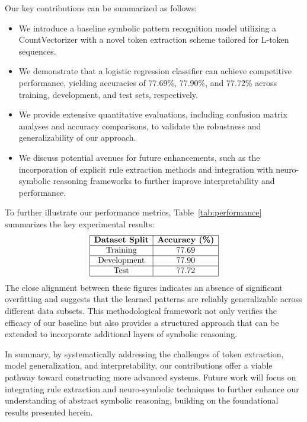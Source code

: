 \documentclass{article}
\begin{document}
Our key contributions can be summarized as follows:
\begin{itemize}
    \item We introduce a baseline symbolic pattern recognition model utilizing a CountVectorizer with a novel token extraction scheme tailored for L-token sequences.
    \item We demonstrate that a logistic regression classifier can achieve competitive performance, yielding accuracies of 77.69\%, 77.90\%, and 77.72\% across training, development, and test sets, respectively.
    \item We provide extensive quantitative evaluations, including confusion matrix analyses and accuracy comparisons, to validate the robustness and generalizability of our approach.
    \item We discuss potential avenues for future enhancements, such as the incorporation of explicit rule extraction methods and integration with neuro-symbolic reasoning frameworks to further improve interpretability and performance.
\end{itemize}

To further illustrate our performance metrics, Table~\ref{tab:performance} summarizes the key experimental results:
\[
\begin{array}{|c|c|}
\hline
\textbf{Dataset Split} & \textbf{Accuracy (\%)} \\ \hline
\text{Training} & 77.69 \\ \hline
\text{Development} & 77.90 \\ \hline
\text{Test} & 77.72 \\ \hline
\end{array}
\]
The close alignment between these figures indicates an absence of significant overfitting and suggests that the learned patterns are reliably generalizable across different data subsets. This methodological framework not only verifies the efficacy of our baseline but also provides a structured approach that can be extended to incorporate additional layers of symbolic reasoning.

In summary, by systematically addressing the challenges of token extraction, model generalization, and interpretability, our contributions offer a viable pathway toward constructing more advanced systems. Future work will focus on integrating rule extraction and neuro-symbolic techniques to further enhance our understanding of abstract symbolic reasoning, building on the foundational results presented herein.
\end{document}
